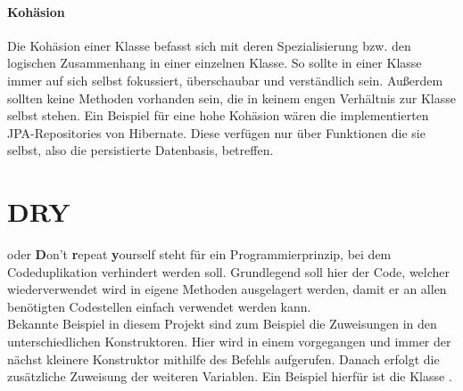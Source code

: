 		\paragraph{Kohäsion}
		Die Kohäsion einer Klasse befasst sich mit deren Spezialisierung bzw. den logischen Zusammenhang in einer einzelnen Klasse. So sollte in einer Klasse immer auf sich selbst fokussiert, überschaubar und verständlich sein. Außerdem sollten keine Methoden vorhanden sein, die in keinem engen Verhältnis zur Klasse selbst stehen. Ein Beispiel für eine hohe Kohäsion wären die implementierten JPA-Repositories von Hibernate. Diese verfügen nur über Funktionen die sie selbst, also die persistierte Datenbasis, betreffen.
		
	
	\section{DRY}
		 oder \textbf{D}on't \textbf{r}epeat \textbf{y}ourself steht für ein Programmierprinzip, bei dem Codeduplikation verhindert werden soll. Grundlegend soll hier der Code, welcher wiederverwendet wird in eigene Methoden ausgelagert werden, damit er an allen benötigten Codestellen einfach verwendet werden kann. \\
		Bekannte Beispiel in diesem Projekt sind zum Beispiel die Zuweisungen in den unterschiedlichen Konstruktoren. Hier wird in einem  vorgegangen und immer der nächst kleinere Konstruktor mithilfe des Befehls  aufgerufen. Danach erfolgt die zusätzliche Zuweisung der weiteren Variablen. Ein Beispiel hierfür ist die Klasse .